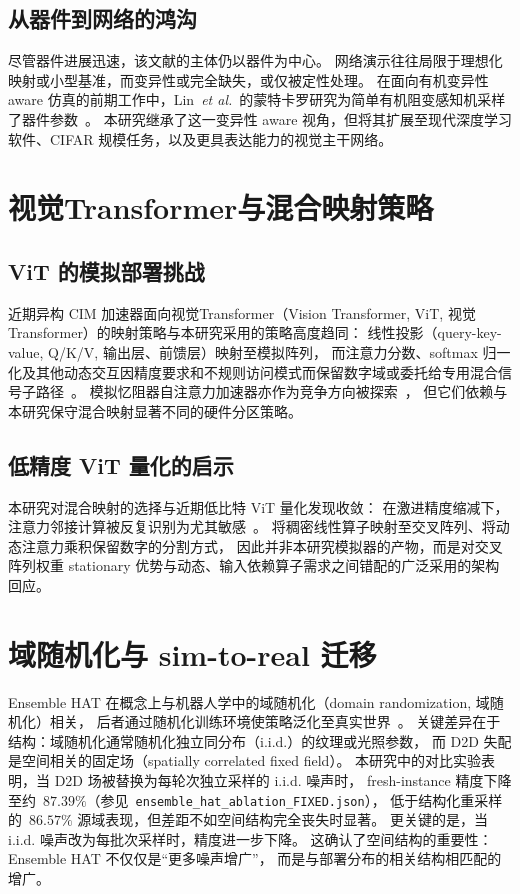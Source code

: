 \subsection{从器件到网络的鸿沟}

尽管器件进展迅速，该文献的主体仍以器件为中心。
网络演示往往局限于理想化映射或小型基准，而变异性或完全缺失，或仅被定性处理。
在面向有机变异性 aware 仿真的前期工作中，Lin~\emph{et al.}~的蒙特卡罗研究为简单有机阻变感知机采样了器件参数~\citep{lin2016physical}。
本研究继承了这一变异性 aware 视角，但将其扩展至现代深度学习软件、CIFAR 规模任务，以及更具表达能力的视觉主干网络。

\section{视觉Transformer与混合映射策略}

\subsection{ViT 的模拟部署挑战}

近期异构 CIM 加速器面向视觉Transformer（Vision Transformer, ViT, 视觉Transformer）的映射策略与本研究采用的策略高度趋同：
线性投影（query-key-value, Q/K/V, 输出层、前馈层）映射至模拟阵列，
而注意力分数、softmax 归一化及其他动态交互因精度要求和不规则访问模式而保留数字域或委托给专用混合信号子路径~\citep{kim2025hemlet,lin2024hardsea}。
模拟忆阻器自注意力加速器亦作为竞争方向被探索~\citep{bettayeb2024memristorattention,qiu2025m3dattention,mia2026trilinear}，
但它们依赖与本研究保守混合映射显著不同的硬件分区策略。

\subsection{低精度 ViT 量化的启示}

本研究对混合映射的选择与近期低比特 ViT 量化发现收敛：
在激进精度缩减下，注意力邻接计算被反复识别为尤其敏感~\citep{liu2021ptqvit,li2022qvit,lin2023vitptq}。
将稠密线性算子映射至交叉阵列、将动态注意力乘积保留数字的分割方式，
因此并非本研究模拟器的产物，而是对交叉阵列权重 stationary 优势与动态、输入依赖算子需求之间错配的广泛采用的架构回应。

\section{域随机化与 sim-to-real 迁移}

Ensemble HAT 在概念上与机器人学中的域随机化（domain randomization, 域随机化）相关，
后者通过随机化训练环境使策略泛化至真实世界~\citep{tobin2017domain}。
关键差异在于结构：域随机化通常随机化独立同分布（i.i.d.）的纹理或光照参数，
而 D2D 失配是空间相关的固定场（spatially correlated fixed field）。
本研究中的对比实验表明，当 D2D 场被替换为每轮次独立采样的 i.i.d. 噪声时，
fresh-instance 精度下降至约~$87.39\%$（参见~\texttt{ensemble\_hat\_ablation\_FIXED.json}），
低于结构化重采样的~$86.57\%$ 源域表现，但差距不如空间结构完全丧失时显著。
更关键的是，当 i.i.d. 噪声改为每批次采样时，精度进一步下降。
这确认了空间结构的重要性：Ensemble HAT 不仅仅是``更多噪声增广''，
而是与部署分布的相关结构相匹配的增广。

